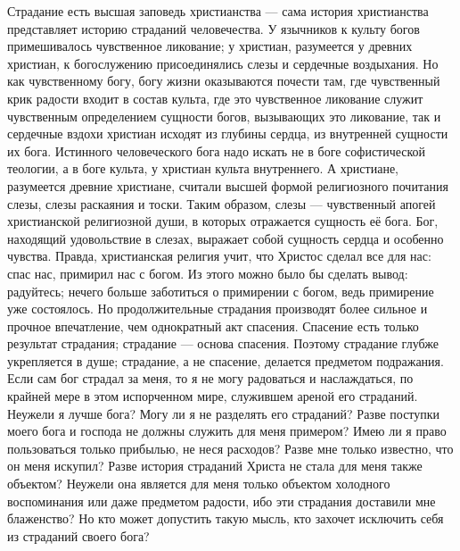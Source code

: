 \documentclass[12pt,oneside]{book}
\begin{document}
Страдание есть высшая заповедь христианства --- сама история христианства представляет историю страданий человечества. У язычников к культу богов примешивалось чувственное ликование; у христиан, разумеется у древних христиан, к богослужению присоединялись слезы и сердечные воздыхания. Но как чувственному богу, богу жизни оказываются почести там, где чувственный крик радости входит в состав культа, где это чувственное ликование служит чувственным определением сущности богов, вызывающих это ликование, так и сердечные вздохи христиан исходят из глубины сердца, из внутренней сущности их бога. Истинного человеческого бога надо искать не в боге софистической теологии, а в боге культа, у христиан культа внутреннего. А христиане, разумеется древние христиане, считали высшей формой религиозного почитания слезы, слезы раскаяния и тоски. Таким образом, слезы --- чувственный апогей христианской религиозной души, в которых отражается сущность её бога. Бог, находящий удовольствие в слезах, выражает собой сущность сердца и особенно чувства. Правда, христианская религия учит, что Христос сделал все для нас: спас нас, примирил нас с богом. Из этого можно было бы сделать вывод: радуйтесь; нечего больше заботиться о примирении с богом, ведь примирение уже состоялось. Но продолжительные страдания производят более сильное и прочное впечатление, чем однократный акт спасения. Спасение есть только результат страдания; страдание --- основа спасения. Поэтому страдание глубже укрепляется в душе; страдание, а не спасение, делается предметом подражания. Если сам бог страдал за меня, то я не могу радоваться и наслаждаться, по крайней мере в этом испорченном мире, служившем ареной его страданий\ddag\let\svthefootnote\thefootnote\let\thefootnote\relax{}\let\thefootnote\svthefootnote. Неужели я лучше бога? Могу ли я не разделять его страданий? Разве поступки моего бога и господа не должны служить для меня примером? Имею ли я право пользоваться только прибылью, не неся расходов? Разве мне только известно, что он меня искупил? Разве история страданий Христа не стала для меня также объектом? Неужели она является для меня только объектом холодного воспоминания или даже предметом радости, ибо эти страдания доставили мне блаженство? Но кто может допустить такую мысль, кто захочет исключить себя из страданий своего бога?
\end{document}
